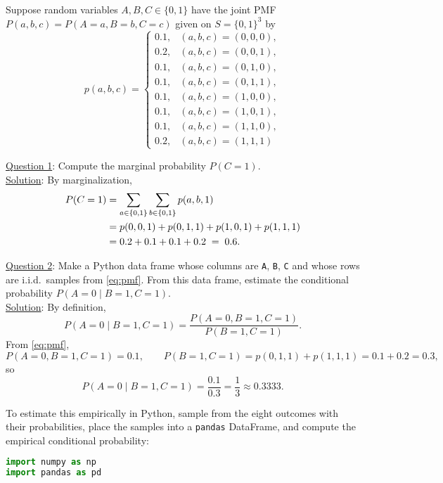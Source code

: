 \begin{example}

Suppose random variables $A,B,C \in \{0,1\}$ have the joint PMF $P(a,b,c)=P(A=a,B=b,C=c)$ given on $S = \{0,1\}^3$ by
\begin{equation}
p(a,b,c)=
\begin{cases}
0.1, & (a,b,c)=(0,0,0),\\
0.2, & (a,b,c)=(0,0,1),\\
0.1, & (a,b,c)=(0,1,0),\\
0.1, & (a,b,c)=(0,1,1),\\
0.1, & (a,b,c)=(1,0,0),\\
0.1, & (a,b,c)=(1,0,1),\\
0.1, & (a,b,c)=(1,1,0),\\
0.2, & (a,b,c)=(1,1,1)
\end{cases}
\label{eq:pmf}
\end{equation}

\noindent
\underline{Question 1}: Compute the marginal probability $P(C=1)$.\\

\noindent
\underline{Solution}: By marginalization,
\begin{align}
P(C=1)
&= \sum_{a\in\{0,1\}}\sum_{b\in\{0,1\}} p(a,b,1) \notag\\
&= p(0,0,1)+p(0,1,1)+p(1,0,1)+p(1,1,1) \notag\\
&= 0.2+0.1+0.1+0.2 \;=\; 0.6.
\label{eq:margC1}
\end{align}

\medskip
\noindent
\underline{Question 2}: Make a Python data frame whose columns are \texttt{A}, \texttt{B}, \texttt{C} and whose rows are i.i.d.\ samples from \eqref{eq:pmf}. From this data frame, estimate the conditional probability $P(A=0 \mid B=1,C=1)$.\\

\noindent
\underline{Solution}: By definition,
\begin{equation}
P(A=0 \mid B=1,C=1)=\frac{P(A=0,B=1,C=1)}{P(B=1,C=1)}.
\label{eq:cond_def}
\end{equation}
From \eqref{eq:pmf},
\[
P(A=0,B=1,C=1)=0.1,\qquad
P(B=1,C=1)=p(0,1,1)+p(1,1,1)=0.1+0.2=0.3,
\]
so
\begin{equation}
P(A=0 \mid B=1,C=1)=\frac{0.1}{0.3}=\frac{1}{3}\approx 0.3333.
\label{eq:cond_value}
\end{equation}

To estimate this empirically in Python, sample from the eight outcomes with their probabilities, place the samples into a \texttt{pandas} DataFrame, and compute the empirical conditional probability:
\begin{lstlisting}[language=Python]
import numpy as np
import pandas as pd


\end{lstlisting}
\end{example}
